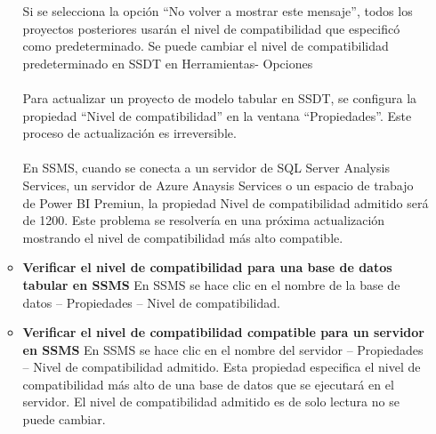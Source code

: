 \documentclass[twoside,twocolumn]{article}
\begin{document}
\begin{enumerate}
\begin{itemize}
Si se selecciona la opción “No volver a mostrar este mensaje”, todos los proyectos posteriores usarán el nivel de compatibilidad que especificó como predeterminado.  Se puede cambiar el nivel de compatibilidad predeterminado en SSDT en Herramientas- Opciones \\ \\
Para actualizar un proyecto de modelo tabular en SSDT, se configura la propiedad “Nivel de compatibilidad” en la ventana “Propiedades”.  Este proceso de actualización es irreversible.\\ \\
En SSMS, cuando se conecta a un servidor de SQL Server Analysis Services, un servidor de Azure Anaysis Services o un espacio de trabajo de Power BI Premiun, la propiedad Nivel de compatibilidad admitido será de 1200.  Este problema se resolvería en una próxima actualización mostrando el nivel de compatibilidad más alto compatible.\\ 
\item \textbf{Verificar el nivel de compatibilidad para una base de datos tabular en SSMS} En SSMS se hace clic en el nombre de la base de datos – Propiedades – Nivel de compatibilidad. \\ 
\item \textbf{Verificar el nivel de compatibilidad compatible para un servidor en SSMS} En SSMS se hace clic en el nombre del servidor – Propiedades – Nivel de compatibilidad admitido.  Esta propiedad especifica el nivel de compatibilidad más alto de una base de datos que se ejecutará en el servidor.  El nivel de compatibilidad admitido es de solo lectura no se puede cambiar. \\ \\

\end{itemize}








	
\end{enumerate}







\end{document}
